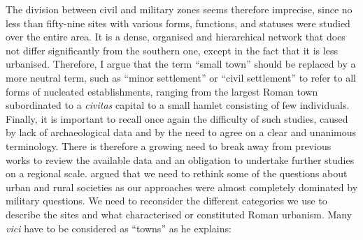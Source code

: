 The division between civil and military zones seems therefore imprecise, since no less than fifty-nine sites with various forms, functions, and statuses were studied over the entire area. It is a dense, organised and hierarchical network that does not differ significantly from the southern one, except in the fact that it is less urbanised. Therefore, I argue that the term “small town” should be replaced by a more neutral term, such as “minor settlement” or “civil settlement” to refer to all forms of nucleated establishments, ranging from the largest Roman town subordinated to a \emph{civitas} capital to a small hamlet consisting of few individuals. Finally, it is important to recall once again the difficulty of such studies, caused by lack of archaeological data and by the need to agree on a clear and unanimous terminology. There is therefore a growing need to break away from previous works to review the available data and an obligation to undertake further studies on a regional scale. \textcite[66]{Millett_2001} argued that we need to rethink some of the questions about urban and rural societies as our approaches were almost completely dominated by military questions. We need to reconsider the different categories we use to describe the sites and what characterised or constituted Roman urbanism. Many \emph{vici} have to be considered as “towns” as he explains: 

